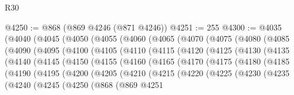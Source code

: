 \begin{lexlean}{R30}
\begin{coremodule}
@4250 := @868 (@869 @4246 (@871 @4246))
@4251 := 255
@4300 := @4035
    (@4040
      (@4045
        (@4050
          (@4055
            (@4060
              (@4065
                (@4070
                  (@4075
                    (@4080
                      (@4085
                        (@4090
                          (@4095
                            (@4100
                              (@4105
                                (@4110
                                  (@4115
                                    (@4120
                                      (@4125
                                        (@4130
                                          (@4135
                                            (@4140
                                              (@4145
                                                (@4150
                                                  (@4155
                                                    (@4160
                                                      (@4165
                                                        (@4170
                                                          (@4175
                                                            (@4180
                                                              (@4185
                                                                (@4190
                                                                  (@4195
                                                                    (@4200
                                                                      (@4205
                                                                        (@4210
                                                                          (@4215
                                                                            (@4220
                                                                              (@4225
                                                                                (@4230
                                                                                  (@4235
                                                                                    (@4240
                                                                                      (@4245
                                                                                        (@4250
                                                                                          (@868
                                                                                            (@869
                                                                                              @4251

\end{coremodule}
\end{lexlean}
